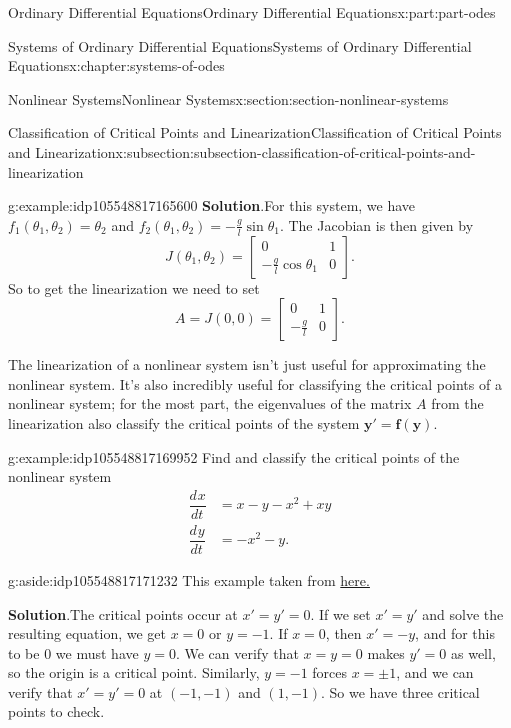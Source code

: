 \documentclass[twoside,10pt,]{book}
\newcommand{\blocktitlefont}{\relax}
\numberwithin{equation}{part}
\renewcommand{\vec}[1]{\mathbf{#1}}
\providecommand{\dv}[3][]{\dfrac{d^{#1} #2}{d #3^{#1}}}
\newcommand{\amp}{&}
\begin{document}
\begin{partptx}{Ordinary Differential Equations}{}{Ordinary Differential Equations}{}{}{x:part:part-odes}
\begin{chapterptx}{Systems of Ordinary Differential Equations}{}{Systems of Ordinary Differential Equations}{}{}{x:chapter:systems-of-odes}
\begin{sectionptx}{Nonlinear Systems}{}{Nonlinear Systems}{}{}{x:section:section-nonlinear-systems}
\begin{subsectionptx}{Classification of Critical Points and Linearization}{}{Classification of Critical Points and Linearization}{}{}{x:subsection:subsection-classification-of-critical-points-and-linearization}
\begin{example}{}{g:example:idp105548817165600}
\noindent\textbf{\blocktitlefont Solution}.\hypertarget{g:solution:idp105548817166880}{}\quad{}For this system, we have \(f_{1}(\theta_{1},\theta_{2}) = \theta_{2}\) and \(f_{2}(\theta_{1},\theta_{2}) = -\frac{g}{l}\sin\theta_{1}\). The Jacobian is then given by%
\begin{equation*}
J(\theta_{1},\theta_{2}) = \begin{bmatrix}0 \amp  1 \\ -\frac{g}{l}\cos\theta_{1} \amp  0\end{bmatrix}.
\end{equation*}
So to get the linearization we need to set%
\begin{equation*}
A = J(0,0) = \begin{bmatrix}0 \amp  1 \\ -\frac{g}{l} \amp  0\end{bmatrix}.
\end{equation*}
%
\end{example}
The linearization of a nonlinear system isn't just useful for approximating the nonlinear system. It's also incredibly useful for classifying the critical points of a nonlinear system; for the most part, the eigenvalues of the matrix \(A\) from the linearization also classify the critical points of the system \(\vec{y}' = \vec{f}(\vec{y})\).%
\begin{example}{}{g:example:idp105548817169952}%
Find and classify the critical points of the nonlinear system%
\begin{align*}
\dv{x}{t} \amp = x - y - x^{2} + xy \\
\dv{y}{t} \amp = -x^{2} - y \text{.}
\end{align*}
%
\begin{aside}{}{g:aside:idp105548817171232}%
This example taken from \href{https://www.math.uci.edu/\~ndonalds/math3d/nonlinear.pdf}{here.}\footnotemark{}%
\end{aside}
\par\smallskip%
\noindent\textbf{\blocktitlefont Solution}.\hypertarget{g:solution:idp105548817172384}{}\quad{}The critical points occur at \(x' = y' = 0\). If we set \(x' = y'\) and solve the resulting equation, we get \(x = 0\) or \(y = -1\). If \(x = 0\), then \(x' = -y\), and for this to be \(0\) we must have \(y = 0\). We can verify that \(x = y = 0\) makes \(y' = 0\) as well, so the origin is a critical point. Similarly, \(y = -1\) forces \(x = \pm1\), and we can verify that \(x' = y' = 0\) at \((-1,-1)\) and \((1,-1)\). So we have three critical points to check.%

\end{example}
\end{subsectionptx}
\end{sectionptx}
\end{chapterptx}
\end{partptx}
\end{document}

